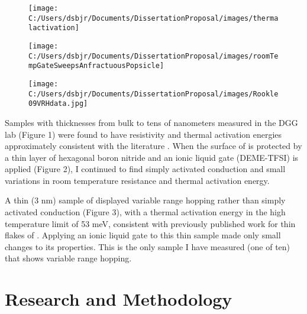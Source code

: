 \documentclass[11pt]{article}
\begin{document}
\begin{figure}
\centering
\begin{minipage}{0.3\textwidth}
\centering 
  {\texttt{[image: C:/Users/dsbjr/Documents/DissertationProposal/images/thermalactivation]}\label{fig:f2}}
  \captionsetup{width=0.9\textwidth}
\end{minipage}%
\begin{minipage}{0.3\textwidth}
\centering
  {\texttt{[image: C:/Users/dsbjr/Documents/DissertationProposal/images/roomTempGateSweepsAnfractuousPopsicle]}\label{fig:f1}}
  \captionsetup{width=0.9\textwidth}
\end{minipage}%
\begin{minipage}{0.3\textwidth}
\centering
	{\texttt{[image: C:/Users/dsbjr/Documents/DissertationProposal/images/Rookle09VRHdata.jpg]}\label{fig:f3}}
	\captionsetup{width=0.9\textwidth}
\end{minipage}
\end{figure}

Samples with thicknesses from bulk to tens of nanometers measured in the DGG lab (Figure 1) were found to have resistivity and thermal activation energies approximately consistent with the literature \cite{Rojas1983}. When the surface of \rucl is protected by a thin layer of hexagonal boron nitride and an ionic liquid gate (DEME-TFSI) is applied (Figure 2), I continued to find simply activated conduction and small variations in room temperature resistance and thermal activation energy.

A thin (3 nm) sample of \rucl displayed variable range hopping rather than simply activated conduction (Figure 3), with a thermal activation energy in the high temperature limit of 53 meV, consistent with previously published work for thin flakes of \rucl \cite{Mashhadi2018}. Applying an ionic liquid gate to this thin sample made only small changes to its properties. This is the only sample I have measured (one of ten) that shows variable range hopping.

\section{Research and Methodology}
\end{document}
